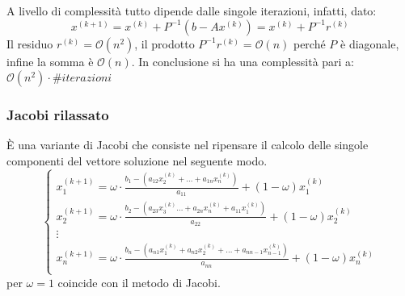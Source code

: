 A livello di complessità tutto dipende dalle singole iterazioni, infatti, dato:
\begin{equation*}
    x^{(k + 1)} = x^{(k)} + P^{-1}(b - Ax^{(k)}) = x^{(k)}+P^{-1}r^{(k)}
\end{equation*}
Il residuo $r^{(k)} = \mathcal{O}(n^2)$, il prodotto $P^{-1}r^(k) = \mathcal{O}(n)$
perché $P$ è diagonale, infine la somma è $\mathcal{O}(n)$. In conclusione si ha
una complessità pari a: $\mathcal{O}(n^2)\cdot \#iterazioni$
\subsubsection{Jacobi rilassato}
È una variante di Jacobi che consiste nel ripensare il calcolo delle singole
componenti del vettore soluzione nel seguente modo.
\begin{equation*}
    \begin{cases}
        x_1^{(k+1)} = \omega \cdot \frac{b_1 - (a_{12} x_2^{(k)} + \dots + a_{1n} x_n^{(k)})}{ a_{11}} +(1-\omega) x_1^{(k)}                      \\
        x_2^{(k+1)} =\omega \cdot \frac{ b_2 - (a_{23} x_3^{(k)}\dots + a_{2n} x_n^{(k)} + a_{11}x_1^{(k)})}{a_{22}}+(1-\omega) x_2^{(k)}         \\
        \vdots                                                                                                                                    \\
        x_n^{(k+1)}= \omega \cdot \frac{b_n - (a_{n1}x_1^{(k)} + a_{n2} x_2^{(k)} + \dots + a_{nn-1} x_{n-1}^{(k)})}{a_{nn}}+(1-\omega) x_n^{(k)} \\
    \end{cases}
\end{equation*}
per $\omega = 1$ coincide con il metodo di Jacobi.

